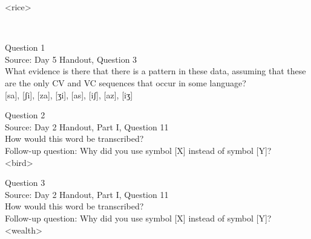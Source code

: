 \documentclass[12pt]{article}
\begin{document}
<rice>


\newpage

\begin{center}
\textbf{{\color{red}{\HUGE END OF EXAM}}}\\

\end{center}
\newpage

\begin{center}
\textbf{{\color{blue}{\HUGE START OF EXAM\\}}}

\textbf{{\color{blue}{\HUGE Student ID: 6427\\}}}

\textbf{{\color{blue}{\HUGE 3:15 - 3:30 PM\\}}}

\end{center}
\newpage

{\large Question 1}\\

Source: Day 5 Handout, Question 3\\

What evidence is there that there is a pattern in these data, assuming that these are the only CV and VC sequences that occur in some language?\\

{[sa]}, {[ʃi]}, {[za]}, {[ʒi]}, {[as]}, {[iʃ]}, {[az]}, {[iʒ]}


\newpage

{\large Question 2}\\

Source: Day 2 Handout, Part I, Question 11\\

How would this word be transcribed?\\ Follow-up question: Why did you use symbol [X] instead of symbol [Y]?\\

<bird>


\newpage

{\large Question 3}\\

Source: Day 2 Handout, Part I, Question 11\\

How would this word be transcribed?\\ Follow-up question: Why did you use symbol [X] instead of symbol [Y]?\\

<wealth>
\end{document}

